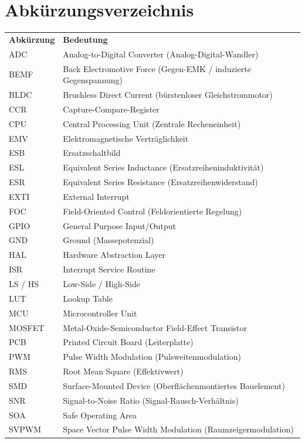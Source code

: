 \chapter*{Abkürzungsverzeichnis}

\begin{tabular}{lp{12cm}}
\textbf{Abkürzung} & \textbf{Bedeutung} \\[1ex]
ADC & Analog-to-Digital Converter (Analog-Digital-Wandler) \\
BEMF & Back Electromotive Force (Gegen-EMK / induzierte Gegenspannung) \\
BLDC & Brushless Direct Current (bürstenloser Gleichstrommotor) \\
CCR & Capture-Compare-Register \\
CPU & Central Processing Unit (Zentrale Recheneinheit) \\
EMV & Elektromagnetische Verträglichkeit \\
ESB & Ersatzschaltbild \\
ESL & Equivalent Series Inductance (Ersatzreiheninduktivität) \\
ESR & Equivalent Series Resistance (Ersatzreihenwiderstand) \\
EXTI & External Interrupt \\
FOC & Field-Oriented Control (Feldorientierte Regelung) \\
GPIO & General Purpose Input/Output \\
GND & Ground (Massepotenzial) \\
HAL & Hardware Abstraction Layer \\
ISR & Interrupt Service Routine \\
LS / HS & Low-Side / High-Side \\
LUT & Lookup Table \\
MCU & Microcontroller Unit \\
MOSFET & Metal-Oxide-Semiconductor Field-Effect Transistor \\
PCB & Printed Circuit Board (Leiterplatte) \\
PWM & Pulse Width Modulation (Pulsweitenmodulation) \\
RMS & Root Mean Square (Effektivwert) \\
SMD & Surface-Mounted Device (Oberflächenmontiertes Bauelement) \\
SNR & Signal-to-Noise Ratio (Signal-Rausch-Verhältnis) \\
SOA & Safe Operating Area \\
SVPWM & Space Vector Pulse Width Modulation (Raumzeigermodulation) \\
\end{tabular}